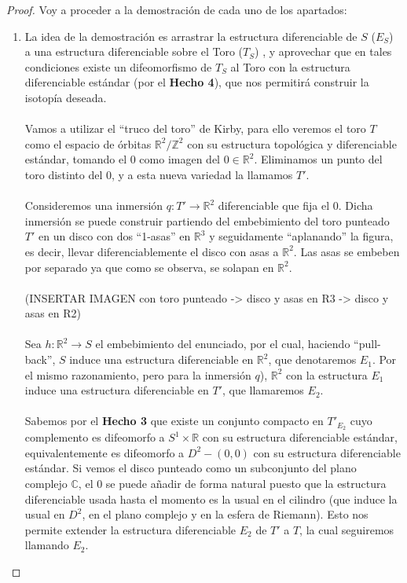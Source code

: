 \begin{proof}
	Voy a proceder a la demostración de cada uno de los apartados: \\
	\begin{enumerate}
		\item La idea de la demostración es arrastrar la estructura diferenciable de $S$ ($E_S$) a una estructura diferenciable sobre el Toro ($T_S$) , y aprovechar que en tales condiciones existe un difeomorfismo de $T_S$ al Toro con la estructura diferenciable estándar (por el \textbf{Hecho 4}), que nos permitirá construir la isotopía deseada.\\
			\\ Vamos a utilizar el ``truco del toro'' de Kirby, para ello veremos el toro $T$ como el espacio de órbitas $\mathbb{R}^2/\mathbb{Z}^2$ con su estructura topológica y diferenciable estándar, tomando el $0$ como imagen del $0\in \mathbb{R}^2$. Eliminamos un punto del toro distinto del $0$, y a esta nueva variedad la llamamos $T'$. \\
			\\ Consideremos una inmersión $q: T' \rightarrow \mathbb{R}^2$ diferenciable que fija el $0$. Dicha inmersión se puede construir partiendo del embebimiento del toro punteado $T'$ en un disco con dos ``1-asas'' en $\mathbb{R}^3$ y seguidamente ``aplanando'' la figura, es decir, llevar diferenciablemente el disco con asas a $\mathbb{R}^2$. Las asas se embeben por separado ya que como se observa, se solapan en $\mathbb{R}^2$.\\
			\\(INSERTAR IMAGEN con toro punteado -> disco y asas en R3 -> disco y asas en R2)\\
			\\ Sea $h:\mathbb{R}^2 \rightarrow S$ el embebimiento del enunciado, por el cual, haciendo ``pull-back'', $S$ induce una estructura diferenciable en $\mathbb{R}^2$, que denotaremos $E_1$. Por el mismo razonamiento, pero para la inmersión $q$), $\mathbb{R}^2$ con la estructura $E_1$ induce una estructura diferenciable en $T'$, que llamaremos $E_2$.\\
			\\ Sabemos por el \textbf{Hecho 3} que existe un conjunto compacto en $T'_{E_2}$ cuyo complemento es difeomorfo a $S^1\times \mathbb{R}$ con su estructura diferenciable estándar, equivalentemente es difeomorfo a $D^2 - {(0,0)}$ con su estructura diferenciable estándar. Si vemos el disco punteado como un subconjunto del plano complejo $\mathbb{C}$, el $0$ se puede añadir de forma natural puesto que la estructura diferenciable usada hasta el momento es la usual en el cilindro (que induce la usual en $D^2$, en el plano complejo y en la esfera de Riemann). Esto nos permite extender la estructura diferenciable $E_2$ de $T'$ a $T$, la cual seguiremos llamando $E_2$.\\

\end{enumerate}
\end{proof}
